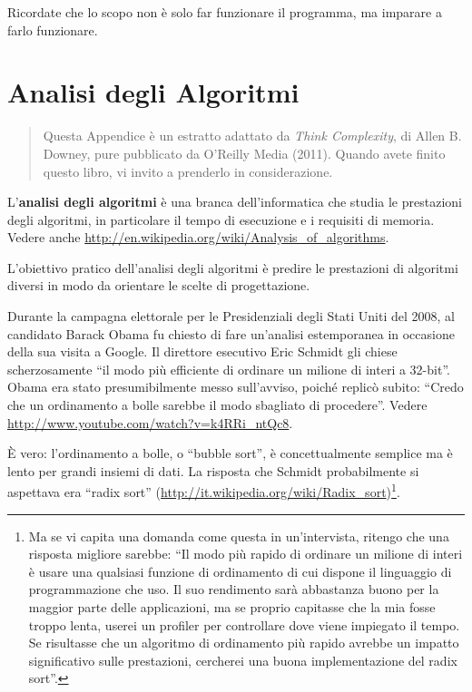 \documentclass[10pt]{book}
\begin{document}
Ricordate che lo scopo non è solo far funzionare il programma, ma imparare a farlo funzionare.


\chapter{Analisi degli Algoritmi}

\begin{quote}
Questa Appendice è un estratto adattato da {\it Think Complexity}, di
Allen B. Downey, pure pubblicato da O'Reilly Media (2011).  Quando avete finito questo libro, vi invito a prenderlo in considerazione.
\end{quote}

L'{\bf analisi degli algoritmi} è una branca dell'informatica che studia le prestazioni degli algoritmi, in particolare il tempo di esecuzione e i requisiti di memoria. Vedere anche
\url{http://en.wikipedia.org/wiki/Analysis_of_algorithms}.
 

L'obiettivo pratico dell'analisi degli algoritmi è predire le prestazioni di algoritmi diversi in modo da orientare le scelte di progettazione.

Durante la campagna elettorale per le Presidenziali degli Stati Uniti del 2008, al candidato Barack Obama fu chiesto di fare un'analisi estemporanea in occasione della sua visita a Google. Il direttore esecutivo Eric Schmidt gli chiese scherzosamente ``il modo più efficiente di ordinare un milione di interi a 32-bit''.
Obama era stato presumibilmente messo sull'avviso, poiché replicò subito: ``Credo che un ordinamento a bolle sarebbe il modo sbagliato di procedere''.
Vedere \url{http://www.youtube.com/watch?v=k4RRi_ntQc8}.

È vero: l'ordinamento a bolle, o ``bubble sort'', è concettualmente semplice ma è lento per grandi insiemi di dati. La risposta che Schmidt probabilmente si aspettava era ``radix sort'' (\url{http://it.wikipedia.org/wiki/Radix_sort})\footnote{Ma se vi capita una domanda come questa in un'intervista, ritengo che una risposta migliore sarebbe: ``Il modo più rapido di ordinare un milione di interi è usare una qualsiasi funzione di ordinamento di cui dispone il linguaggio di programmazione che uso. Il suo rendimento sarà abbastanza buono per la maggior parte delle applicazioni, ma se proprio capitasse che la mia fosse troppo lenta, userei un profiler per controllare dove viene impiegato il tempo. Se risultasse che un algoritmo di ordinamento più rapido avrebbe un impatto significativo sulle prestazioni, cercherei una buona implementazione del radix sort''.}.
\end{document}
